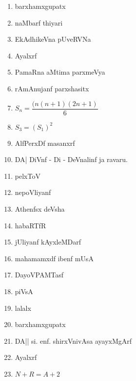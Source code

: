 \begin{enumerate}
\item barxhamxgupatx

\item naMbarf thiyari

\item EkAdhikeVna pUveRVNa

\item Ayalxrf

\item PamaRna aMtima parxmeVya

\item rAmAnujanf parxshasitx

\item $S_n = \dfrac{(n(n+1)(2n+1)}{6}$

\item $S_3=(S_1)^2$

\item AlfPerxDf masanxrf

\item DA| DiVnf - Di - DeVnalinf ja ravaru.

\item pelxToV

\item nepoVliyanf

\item Athenfsx deVsha

\item habaRTfR

\item jUliyanf kAyxleMDarf

\item mahamamxdf ibenf mUsA

\item DayoVPAMTasf

\item piVsA

\item lalalx

\item barxhamxgupatx

\item DA|| si. enf. shirxVnivAsa ayayxMgArf

\item Ayalxrf

\item $N+R=A+2$

\end{enumerate}
